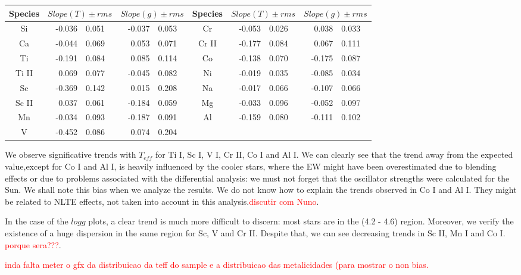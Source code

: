 \documentclass[dvips,12pt,a4paper]{report}
\begin{document}
{{\begin{table}[h]
\begin{tabular}{ c r@{$\pm$}l r@{$\pm$}l | c r@{$\pm$}l r@{$\pm$}l}
\hline
\hline 
Species & \multicolumn {2}{c}{$Slope(T)\pm rms$} & \multicolumn {2}{c}{$Slope(g)\pm rms$} & Species & \multicolumn {2}{c}{$Slope(T)\pm rms$} & \multicolumn {2}{c}{$Slope(g)\pm rms$} \\
\hline
Si & -0.036 & 0.051 & -0.037	& 0.053 & Cr & -0.053 &   0.026 & 0.038 & 0.033 \\
Ca &  -0.044 &    0.069 & 0.053 & 0.071 & Cr II &  -0.177 & 0.084 & 0.067 & 0.111 \\
Ti & -0.191 & 0.084 & 0.085	& 0.114 & Co & -0.138 &  0.070 & -0.175 & 0.087 \\ 
Ti II &  0.069 & 0.077 & -0.045 & 0.082 &  Ni & -0.019 & 0.035 & -0.085 & 0.034 \\
Sc & -0.369 & 0.142 & 0.015 & 0.208	& Na &-0.017 &   0.066 & -0.107 & 0.066 \\
Sc II &  0.037 & 0.061 & -0.184 & 0.059 & Mg & -0.033 & 0.096& -0.052 & 0.097 \\
Mn & -0.034  &  0.093  & -0.187 & 0.091 &  Al & -0.159  &    0.080 & -0.111 & 0.102 \\
V & -0.452 & 0.086 & 0.074 & 0.204 \\
\hline

\end{tabular}
\end{table}

We observe significative trends with $T_{eff}$ for Ti I, Sc I, V I, Cr II, Co I and Al I. We can clearly see that the trend away from the expected value,except for Co I and Al I, is heavily influenced by the cooler stars, where the EW might have been overestimated due to blending effects or due to problems associated with the differential analysis: we must not forget that the oscillator strengths were calculated for the Sun. We shall note this bias when we analyze the results. We do not know how to explain the trends observed in Co I and Al I. They might be related to NLTE effects, not taken into account in this analysis.\textcolor{red}{discutir com Nuno}. 

In the case of the $log g$ plots, a clear trend is much more difficult to discern: most stars are in the (4.2 - 4.6) region. Moreover, we verify the existence of a huge dispersion in the same region for Sc, V and Cr II. Despite that, we can see decreasing trends in Sc II, Mn I and Co I. \textcolor{red}{porque sera???}. 

\textcolor{red}{inda falta meter o gfx da distribuicao da teff do sample e a distribuicao das metalicidades (para mostrar o non bias.}







}}
\end{document}
